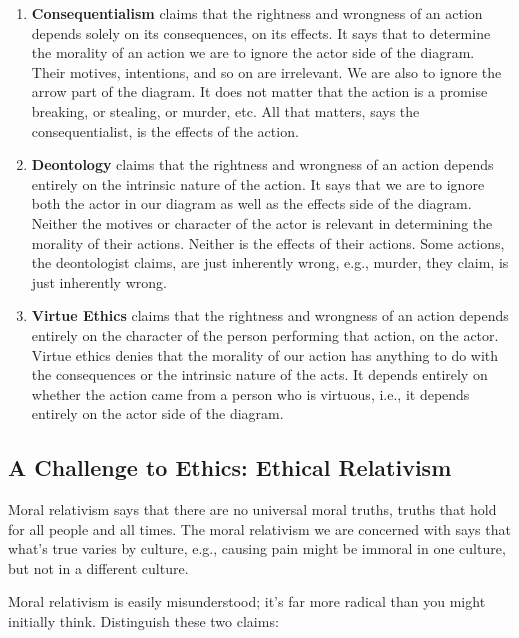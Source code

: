 \documentclass[9pt]{article}
\providecommand{\tightlist}{%
  \setlength{\itemsep}{0pt}\setlength{\parskip}{0pt}}
\begin{document}
\begin{enumerate}
\def\labelenumi{\arabic{enumi}.}
\tightlist
\item
  \textbf{Consequentialism} claims that the rightness and wrongness of
  an action depends solely on its consequences, on its effects. It says
  that to determine the morality of an action we are to ignore the actor
  side of the diagram. Their motives, intentions, and so on are
  irrelevant. We are also to ignore the arrow part of the diagram. It
  does not matter that the action is a promise breaking, or stealing, or
  murder, etc. All that matters, says the consequentialist, is the
  effects of the action.\\
\item
  \textbf{Deontology} claims that the rightness and wrongness of an
  action depends entirely on the intrinsic nature of the action. It says
  that we are to ignore both the actor in our diagram as well as the
  effects side of the diagram. Neither the motives or character of the
  actor is relevant in determining the morality of their actions.
  Neither is the effects of their actions. Some actions, the
  deontologist claims, are just inherently wrong, e.g., murder, they
  claim, is just inherently wrong.\\
\item
  \textbf{Virtue Ethics} claims that the rightness and wrongness of an
  action depends entirely on the character of the person performing that
  action, on the actor. Virtue ethics denies that the morality of our
  action has anything to do with the consequences or the intrinsic
  nature of the acts. It depends entirely on whether the action came
  from a person who is virtuous, i.e., it depends entirely on the actor
  side of the diagram.
\end{enumerate}

\subsection{A Challenge to Ethics: Ethical
Relativism}\label{a-challenge-to-ethics-ethical-relativism}

Moral relativism says that there are no universal moral truths, truths
that hold for all people and all times. The moral relativism we are
concerned with says that what's true varies by culture, e.g., causing
pain might be immoral in one culture, but not in a different culture.

Moral relativism is easily misunderstood; it's far more radical than you
might initially think. Distinguish these two claims:
\end{document}
